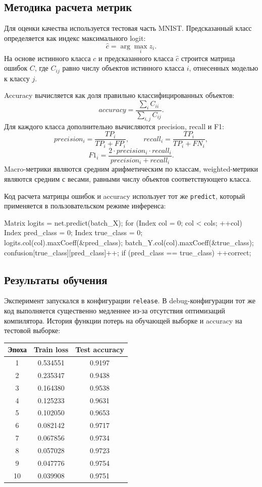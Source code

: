 \documentclass{article}
\begin{document}
\subsection{Методика расчета метрик}

Для оценки качества используется тестовая часть MNIST. Предсказанный
класс определяется как индекс максимального logit:
\[
    \hat{c} = \arg\max_i z_i.
\]
На основе истинного класса $c$ и предсказанного класса $\hat{c}$
строится матрица ошибок $C$, где $C_{ij}$ равно числу объектов
истинного класса $i$, отнесенных моделью к классу $j$.

Accuracy вычисляется как доля правильно классифицированных объектов:
\[
    accuracy = \frac{\sum_i C_{ii}}{\sum_{i,j} C_{ij}}.
\]
Для каждого класса дополнительно вычисляются precision, recall и F1:
\[
    precision_i = \frac{TP_i}{TP_i + FP_i}, \qquad
    recall_i = \frac{TP_i}{TP_i + FN_i},
\]
\[
    F1_i =
    \frac{2 \cdot precision_i \cdot recall_i}
         {precision_i + recall_i}.
\]
Macro-метрики являются средним арифметическим по классам,
weighted-метрики являются средним с весами, равными числу объектов
соответствующего класса.

Код расчета матрицы ошибок и accuracy использует тот же
\texttt{predict}, который применяется в пользовательском режиме
инференса:
\begin{cppcode}
Matrix logits = net.predict(batch_X);
for (Index col = 0; col < cols; ++col) {
    Index pred_class = 0;
    Index true_class = 0;
    logits.col(col).maxCoeff(&pred_class);
    batch_Y.col(col).maxCoeff(&true_class);
    confusion[true_class][pred_class]++;
    if (pred_class == true_class) {
        ++correct;
    }
}
\end{cppcode}

\subsection{Результаты обучения}

Эксперимент запускался в конфигурации \texttt{release}. В
debug-конфигурации тот же код выполняется существенно медленнее из-за
отсутствия оптимизаций компилятора. История функции потерь на
обучающей выборке и accuracy на тестовой выборке:
\begin{center}
\begin{tabular}{|c|c|c|}
\hline
Эпоха & Train loss & Test accuracy \\
\hline
1 & 0.534551 & 0.9197 \\
2 & 0.235347 & 0.9438 \\
3 & 0.164380 & 0.9538 \\
4 & 0.125233 & 0.9631 \\
5 & 0.102050 & 0.9653 \\
6 & 0.082142 & 0.9717 \\
7 & 0.067856 & 0.9734 \\
8 & 0.057028 & 0.9723 \\
9 & 0.047776 & 0.9754 \\
10 & 0.039908 & 0.9751 \\
\hline
\end{tabular}
\end{center}
\end{document}
